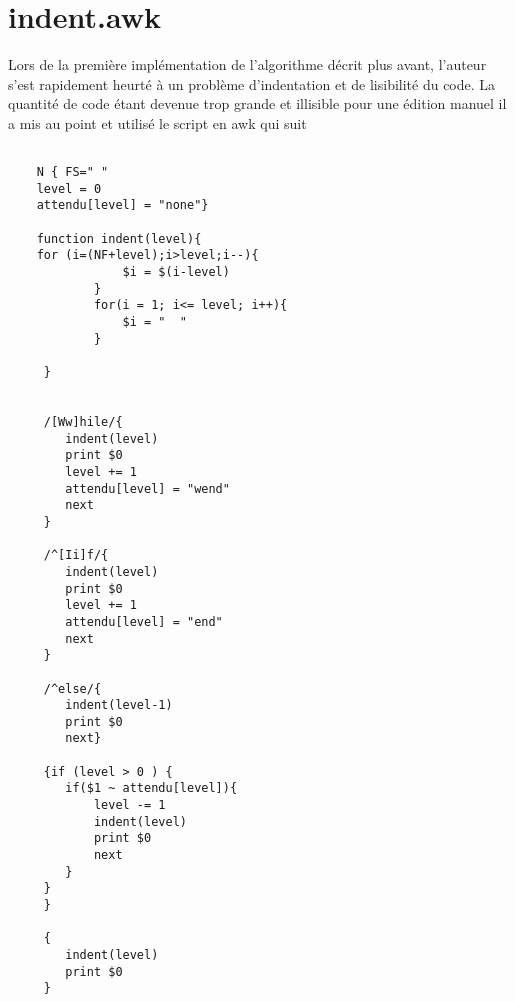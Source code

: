 \documentclass[11pt]{report}
\begin{document}
\section{indent.awk}
Lors de la première implémentation de l'algorithme décrit plus avant, l'auteur s'est rapidement heurté à un problème d'indentation et de lisibilité du code. La quantité de code étant devenue trop grande et illisible pour une édition manuel il a mis au point et utilisé le script en awk qui suit
\begin{verbatim}

	N { FS=" " 
	level = 0
	attendu[level] = "none"}

	function indent(level){
	for (i=(NF+level);i>level;i--){
				$i = $(i-level)
			}
			for(i = 1; i<= level; i++){
				$i = "  "
			}

	 }


	 /[Ww]hile/{
		indent(level)
		print $0
		level += 1
		attendu[level] = "wend"
		next
	 }

	 /^[Ii]f/{
		indent(level)
		print $0
		level += 1
		attendu[level] = "end"
		next
	 }

	 /^else/{
		indent(level-1)
		print $0
		next}

	 {if (level > 0 ) {
		if($1 ~ attendu[level]){
			level -= 1
			indent(level)
			print $0
			next
		}
	 }
	 }

	 {
		indent(level)
		print $0
	 }
\end{verbatim}
\end{document}
